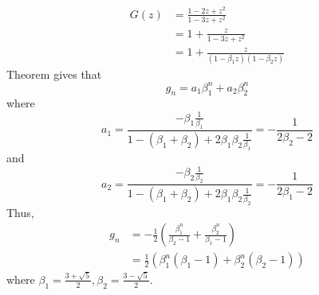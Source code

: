 \documentclass[a4paper,12pt]{article}
\makeatletter
\newtheorem*{solution}{Solution}
\theoremstyle{definition}
\renewenvironment{solution}[1][Solution] {\par\pushQED{\qed}\normalfont\topsep6\p@\@plus6\p@\relax\trivlist\item[\hskip\labelsep\bfseries#1\@addpunct{.}]\ignorespaces}{\popQED\endtrivlist\@endpefalse} \makeatother
\newenvironment{problems}{\begin{list}{}{\renewcommand{\makelabel}[1]{\textbf{##1}\hfil}}}{\end{list}}
\makeatother
\begin{document}
\begin{problems}
\begin{solution}
\begin{align*}
            G(z) &= \frac{1-2z+z^2}{1-3z+z^2} \\
            &= 1 + \frac{z}{1-3z+z^2} \\
            &= 1+ \frac{z}{(1-\beta_1 z)(1-\beta_2 z)}
        \end{align*}
        Theorem gives that
        \begin{equation*}
            g_n = a_1 \beta_1^n + a_2 \beta_2^n
        \end{equation*}
        where
        \begin{equation*}
            a_1 = \frac{-\beta_1 \frac{1}{\beta_1}}{1-(\beta_1+\beta_2)+2\beta_1\beta_2\frac{1}{\beta_1}} = -\frac{1}{2\beta_2-2}
        \end{equation*}
        and 
        \begin{equation*}
            a_2 = \frac{-\beta_2 \frac{1}{\beta_2}}{1-(\beta_1+\beta_2)+2\beta_1\beta_2\frac{1}{\beta_2}} = -\frac{1}{2\beta_1-2}
        \end{equation*}
        Thus,
        \begin{align*}
            g_n &= -\frac{1}{2}\left(\frac{\beta_1^n}{\beta_2-1}+\frac{\beta_2^n}{\beta_1-1}\right)\\
            &= \frac{1}{2}(\beta_1^n(\beta_1-1)+\beta_2^n(\beta_2-1))
        \end{align*}
        where $\beta_1=\frac{3+\sqrt{5}}{2},\beta_2=\frac{3-\sqrt{5}}{2}$.
    \end{solution}
\end{problems}
\end{document}
